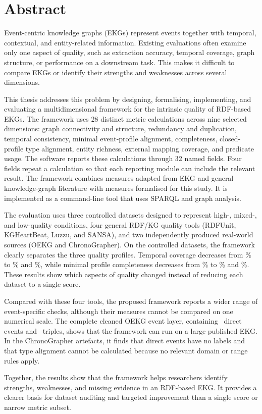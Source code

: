 \section*{Abstract}
Event-centric knowledge graphs (EKGs) represent events together with temporal, contextual, and entity-related information. Existing evaluations often examine only one aspect of quality, such as extraction accuracy, temporal coverage, graph structure, or performance on a downstream task. This makes it difficult to compare EKGs or identify their strengths and weaknesses across several dimensions.

This thesis addresses this problem by designing, formalising, implementing, and evaluating a multidimensional framework for the intrinsic quality of RDF-based EKGs. The framework uses 28 distinct metric calculations across nine selected dimensions: graph connectivity and structure, redundancy and duplication, temporal consistency, minimal event-profile alignment, completeness, closed-profile type alignment, entity richness, external mapping coverage, and predicate usage. The software reports these calculations through 32 named fields. Four fields repeat a calculation so that each reporting module can include the relevant result. The framework combines measures adapted from EKG and general knowledge-graph literature with measures formalised for this study. It is implemented as a command-line tool that uses SPARQL and graph analysis.

The evaluation uses three controlled datasets designed to represent high-, mixed-, and low-quality conditions, four general RDF/KG quality tools (RDFUnit, KGHeartBeat, Luzzu, and SANSA), and two independently produced real-world sources (OEKG and ChronoGrapher). On the controlled datasets, the framework clearly separates the three quality profiles. Temporal coverage decreases from \DOneTemporalCoveragePct\% to \DTwoTemporalCoveragePct\% and \DThreeTemporalCoveragePct\%, while minimal profile completeness decreases from \DOneCompletenessPct\% to \DTwoCompletenessPct\% and \DThreeCompletenessPct\%. These results show which aspects of quality changed instead of reducing each dataset to a single score.

Compared with these four tools, the proposed framework reports a wider range of event-specific checks, although their measures cannot be compared on one numerical scale. The complete cleaned OEKG event layer, containing \OEKGEvents\ direct events and \OEKGTriples\ triples, shows that the framework can run on a large published EKG. In the ChronoGrapher artefacts, it finds that direct events have no labels and that type alignment cannot be calculated because no relevant domain or range rules apply.

Together, the results show that the framework helps researchers identify strengths, weaknesses, and missing evidence in an RDF-based EKG. It provides a clearer basis for dataset auditing and targeted improvement than a single score or narrow metric subset.
